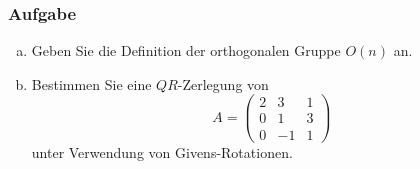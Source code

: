 \documentclass[a4paper,11pt]{scrartcl}
\newcounter{auf}
\newcommand{\Aufgabe}%
        {\addtocounter{auf}{1} \subsubsection*{\rmfamily  Aufgabe \theauf \hspace{1em}} }
\newcommand{\RR}{\mathbb{R}}
\begin{document}
\newpage
\Aufgabe
\begin{enumerate}[a)]
\item Geben Sie die Definition der orthogonalen Gruppe $O(n)$ an.
\item Bestimmen Sie eine $QR$-Zerlegung von 
$$
A=\begin{pmatrix}2&3&1\\0&1&3\\0&-1&1 \end{pmatrix}
$$
unter Verwendung von Givens-Rotationen.
\end{enumerate}
%
%
\end{document}

